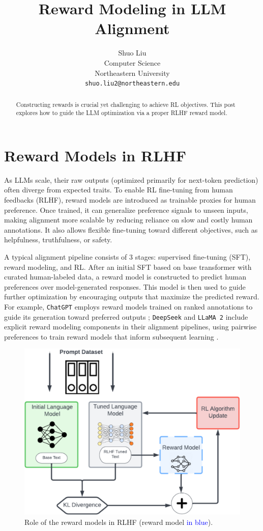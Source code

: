 \documentclass{article} %
\title{Reward Modeling in LLM Alignment}
\author{Shuo Liu \\
Computer Science\\
Northeastern University\\
\texttt{shuo.liu2@northeastern.edu} \\
}
\newcommand{\blue}[1]{\textcolor{blue}{#1}}
\begin{document}
\maketitle

\begin{abstract}
	Constructing rewards is crucial yet challenging to achieve RL objectives. This post explores how to guide the LLM optimization via a proper RLHF reward model.
\end{abstract}

\section{Reward Models in RLHF}

As LLMs scale, their raw outputs (optimized primarily for next-token prediction) often diverge from expected traits. To enable RL fine-tuning from human feedbacks (RLHF), reward models are introduced as trainable proxies for human preference. Once trained, it can generalize preference signals to unseen inputs, making alignment more scalable by reducing reliance on slow and costly human annotations. It also allows flexible fine-tuning toward different objectives, such as helpfulness, truthfulness, or safety.

A typical alignment pipeline consists of 3 stages: supervised fine-tuning (SFT), reward modeling, and RL. After an initial SFT based on base transformer with curated human-labeled data, a reward model is constructed to predict human preferences over model-generated responses. This model is then used to guide further optimization by encouraging outputs that maximize the predicted reward. For example, \texttt{ChatGPT} employs reward models trained on ranked annotations to guide its generation toward preferred outputs \cite{openai2024gpt4technicalreport}; \texttt{DeepSeek} and \texttt{LLaMA 2} include explicit reward modeling components in their alignment pipelines, using pairwise preferences to train reward models that inform subsequent learning \cite{shao2024deepseekmathpushinglimitsmathematical, llama}.

\begin{figure}[hbt]
\centering
  \includegraphics[width=0.6\linewidth,height=0.44\linewidth]{RLHF.png}
  \caption{Role of the reward models in RLHF (reward model \blue{in blue}).}
\end{figure}







%
\end{document}
